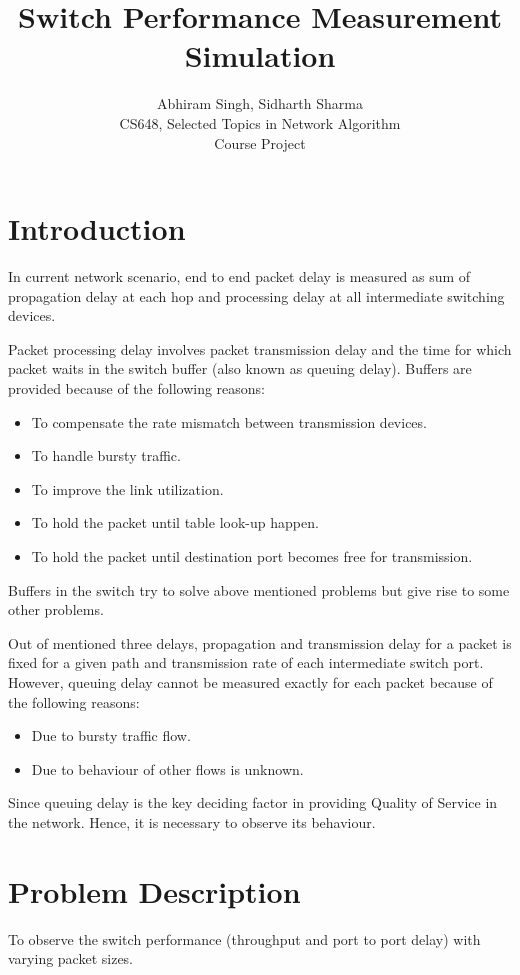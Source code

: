 \documentclass[twocolumn,10pt]{article}
\date{}
\begin{document}
\title{\textbf{Switch Performance Measurement Simulation}}
\author{Abhiram Singh, Sidharth Sharma \\CS648, Selected Topics in Network Algorithm \\ Course Project}
\maketitle

\section{Introduction}
In current network scenario, end to end packet delay is measured as sum of propagation delay at each hop and processing delay at all intermediate switching devices.

Packet processing delay involves packet transmission delay and the time for which packet waits in the switch buffer (also known as queuing delay).
Buffers are provided because of the following reasons:
\begin{itemize}
\item To compensate the rate mismatch between transmission devices.
\item To handle bursty traffic.
\item To improve the link utilization.
\item To hold the packet until table look-up happen.
\item To hold the packet until destination port becomes free for transmission.
\end{itemize}
Buffers in the switch try to solve above mentioned problems but give rise to some other problems.

Out of mentioned three delays, propagation and transmission delay for a packet is fixed for a given path and transmission rate of each intermediate switch port.
However, queuing delay cannot be measured exactly for each packet because of the following reasons:
\begin{itemize}
\item Due to bursty traffic flow.
\item Due to behaviour of other flows is unknown.
\end{itemize}
Since queuing delay is the key deciding factor in providing Quality of Service in the network. Hence, it is necessary to observe its behaviour.

\section{Problem Description}
To observe the switch performance (throughput and port to port delay) with varying packet sizes. 
\end{document}
